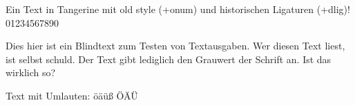 \documentclass{article}
\begin{document}
\Huge

Ein Text in Tangerine mit old style (+onum) und historischen Ligaturen (+dlig)! 01234567890

Dies hier ist ein Blindtext zum Testen von Textausgaben.
Wer diesen Text liest, ist selbst schuld. Der Text gibt lediglich
den Grauwert der Schrift an. Ist das wirklich so?

Text mit Umlauten: öäüß ÖÄÜ
\end{document}
